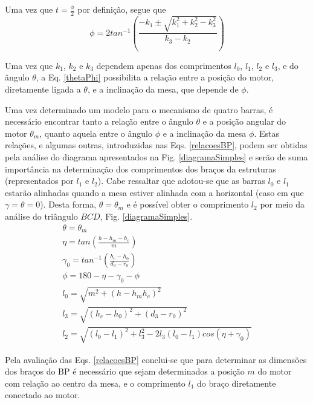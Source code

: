 \documentclass[12pt]{article}
\begin{document}
	Uma vez que $ t = \frac{\phi}{2} $ por definição, segue que
	\begin{equation}
		\label{thetaPhi}
		\phi = 2 tan^{-1} \left( \frac{-k_1 \pm \sqrt{k_1^2 + k_2^2 - k_3^2}}{k_3 - k_2} \right)
	\end{equation}

	Uma vez que $ k_1 $, $ k_2 $ e $ k_3 $ dependem apenas dos comprimentos $ l_0 $, $ l_1 $, $ l_2 $ e $ l_3 $, e do ângulo $ \theta $, a Eq. \ref{thetaPhi} possibilita a relação entre a posição do motor, diretamente ligada a $ \theta $, e a inclinação da mesa, que depende de $ \phi $. 
	
	Uma vez determinado um modelo para o mecanismo de quatro barras, é necessário encontrar tanto a relação entre o ângulo $ \theta $ e a posição angular do motor $ \theta_m $, quanto aquela entre o ângulo $ \phi $ e a inclinação da mesa $ \phi $. Estas relações, e algumas outras, introduzidas nas Eqs. \ref{relacoesBP}, podem ser obtidas pela análise do diagrama apresentados na Fig. \ref{diagramaSimples} e serão de suma importância na determinação dos comprimentos dos braços da estruturas (representados por $ l_1 $ e $ l_2 $). Cabe ressaltar que adotou-se que as barras $ l_0 $ e $ l_1 $ estarão alinhadas quando a mesa estiver alinhada com a horizontal (caso em que $ \gamma = \theta = 0 $). Desta forma, $ \theta = \theta_m $ e é possível obter o comprimento $l_2$ por meio da análise do triângulo $ BCD $, Fig. \ref{diagramaSimples}.
	\begin{equation}
		\label{relacoesBP}
		\begin{gathered}
			\theta = \theta_m \\
			\eta = tan\left( \frac{h - h_m - h_c}{m} \right) \\
			\gamma_0 = tan^{-1} \left( \frac{h_c - h_0}{d_3 - r_0} \right) \\
			\phi = 180 - \eta - \gamma_0 - \phi \\
			l_0 = \sqrt{m^2 + (h - h_m h_c)^2} \\
			l_3 = \sqrt{(h_c - h_0)^2 + (d_3 - r_0)^2} \\
			l_2 = \sqrt{(l_0 - l_1)^2 + l_3^2 - 2 l_3 (l_0 - l_1) cos (\eta + \gamma_0)}
		\end{gathered}
	\end{equation}

	Pela avaliação das Eqs. \ref{relacoesBP} conclui-se que para determinar as dimensões dos braços do BP é necessário que sejam determinados a posição $ m $ do motor com relação ao centro da mesa, e o comprimento $ l_1 $ do braço diretamente conectado ao motor. 
\end{document}
